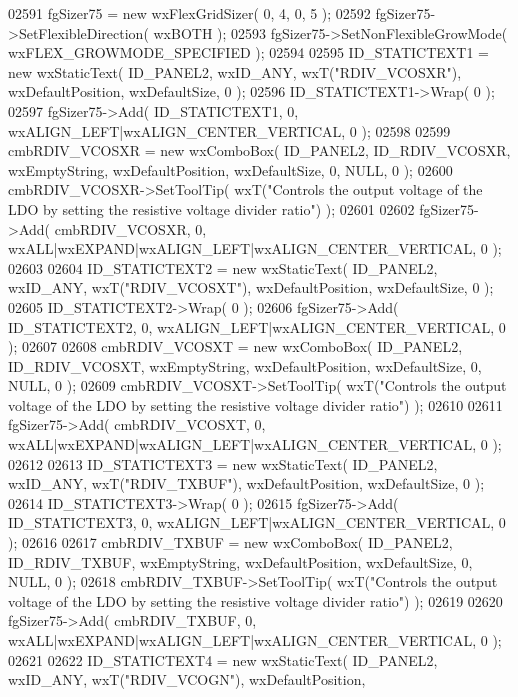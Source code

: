 \begin{DoxyCode}
02591     fgSizer75 = \textcolor{keyword}{new} wxFlexGridSizer( 0, 4, 0, 5 );
02592     fgSizer75->SetFlexibleDirection( wxBOTH );
02593     fgSizer75->SetNonFlexibleGrowMode( wxFLEX\_GROWMODE\_SPECIFIED );
02594     
02595     ID_STATICTEXT1 = \textcolor{keyword}{new} wxStaticText( ID_PANEL2, wxID\_ANY, wxT(\textcolor{stringliteral}{"RDIV\_VCOSXR"}), wxDefaultPosition, 
      wxDefaultSize, 0 );
02596     ID_STATICTEXT1->Wrap( 0 );
02597     fgSizer75->Add( ID_STATICTEXT1, 0, wxALIGN\_LEFT|wxALIGN\_CENTER\_VERTICAL, 0 );
02598     
02599     cmbRDIV_VCOSXR = \textcolor{keyword}{new} wxComboBox( ID_PANEL2, ID_RDIV_VCOSXR, wxEmptyString, wxDefaultPosition, 
      wxDefaultSize, 0, NULL, 0 ); 
02600     cmbRDIV_VCOSXR->SetToolTip( wxT(\textcolor{stringliteral}{"Controls the output voltage of the LDO by setting the resistive
       voltage divider ratio"}) );
02601     
02602     fgSizer75->Add( cmbRDIV_VCOSXR, 0, wxALL|wxEXPAND|wxALIGN\_LEFT|wxALIGN\_CENTER\_VERTICAL, 0 );
02603     
02604     ID_STATICTEXT2 = \textcolor{keyword}{new} wxStaticText( ID_PANEL2, wxID\_ANY, wxT(\textcolor{stringliteral}{"RDIV\_VCOSXT"}), wxDefaultPosition, 
      wxDefaultSize, 0 );
02605     ID_STATICTEXT2->Wrap( 0 );
02606     fgSizer75->Add( ID_STATICTEXT2, 0, wxALIGN\_LEFT|wxALIGN\_CENTER\_VERTICAL, 0 );
02607     
02608     cmbRDIV_VCOSXT = \textcolor{keyword}{new} wxComboBox( ID_PANEL2, ID_RDIV_VCOSXT, wxEmptyString, wxDefaultPosition, 
      wxDefaultSize, 0, NULL, 0 ); 
02609     cmbRDIV_VCOSXT->SetToolTip( wxT(\textcolor{stringliteral}{"Controls the output voltage of the LDO by setting the resistive
       voltage divider ratio"}) );
02610     
02611     fgSizer75->Add( cmbRDIV_VCOSXT, 0, wxALL|wxEXPAND|wxALIGN\_LEFT|wxALIGN\_CENTER\_VERTICAL, 0 );
02612     
02613     ID_STATICTEXT3 = \textcolor{keyword}{new} wxStaticText( ID_PANEL2, wxID\_ANY, wxT(\textcolor{stringliteral}{"RDIV\_TXBUF"}), wxDefaultPosition, 
      wxDefaultSize, 0 );
02614     ID_STATICTEXT3->Wrap( 0 );
02615     fgSizer75->Add( ID_STATICTEXT3, 0, wxALIGN\_LEFT|wxALIGN\_CENTER\_VERTICAL, 0 );
02616     
02617     cmbRDIV_TXBUF = \textcolor{keyword}{new} wxComboBox( ID_PANEL2, ID_RDIV_TXBUF, wxEmptyString, wxDefaultPosition, 
      wxDefaultSize, 0, NULL, 0 ); 
02618     cmbRDIV_TXBUF->SetToolTip( wxT(\textcolor{stringliteral}{"Controls the output voltage of the LDO by setting the resistive voltage
       divider ratio"}) );
02619     
02620     fgSizer75->Add( cmbRDIV_TXBUF, 0, wxALL|wxEXPAND|wxALIGN\_LEFT|wxALIGN\_CENTER\_VERTICAL, 0 );
02621     
02622     ID_STATICTEXT4 = \textcolor{keyword}{new} wxStaticText( ID_PANEL2, wxID\_ANY, wxT(\textcolor{stringliteral}{"RDIV\_VCOGN"}), wxDefaultPosition, 

\end{DoxyCode}
